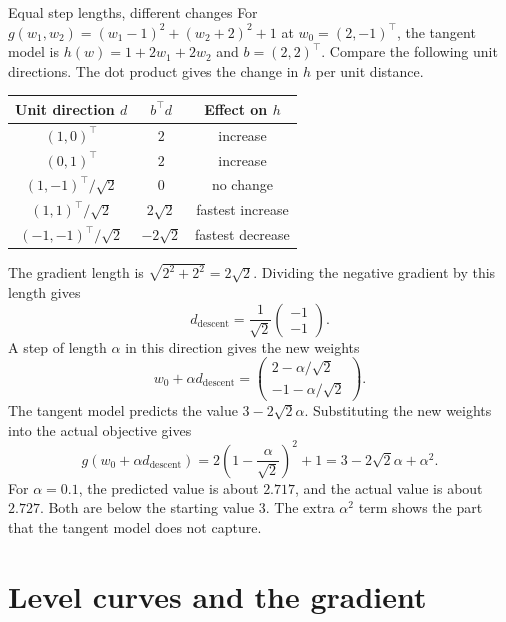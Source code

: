 \documentclass[a4paper,12pt,oneside]{report}
\begin{document}
\begin{framedexample}{Equal step lengths, different changes}
For $g(w_1,w_2)=(w_1-1)^2+(w_2+2)^2+1$ at $w_0=(2,-1)^\top$,
the tangent model is $h(w)=1+2w_1+2w_2$ and $b=(2,2)^\top$.
Compare the following unit directions. The dot product gives the
change in $h$ per unit distance.

\begin{center}
\begin{tabular}{ccc}
\toprule
Unit direction $d$ & $b^\top d$ & Effect on $h$\\
\midrule
$(1,0)^\top$ & $2$ & increase\\[3pt]
$(0,1)^\top$ & $2$ & increase\\[3pt]
$(1,-1)^\top/\sqrt{2}$ & $0$ & no change\\[3pt]
$(1,1)^\top/\sqrt{2}$ & $2\sqrt{2}$ & fastest increase\\[3pt]
$(-1,-1)^\top/\sqrt{2}$ & $-2\sqrt{2}$ & fastest decrease\\
\bottomrule
\end{tabular}
\end{center}

The gradient length is $\sqrt{2^2+2^2}=2\sqrt{2}$. Dividing the
negative gradient by this length gives
\[
  d_{\mathrm{descent}}=
  \frac{1}{\sqrt{2}}\begin{pmatrix}-1\\-1\end{pmatrix}.
\]
A step of length $\alpha$ in this direction gives the new weights
\[
  w_0+\alpha d_{\mathrm{descent}}
  =\begin{pmatrix}2-\alpha/\sqrt{2}\\-1-\alpha/\sqrt{2}\end{pmatrix}.
\]
The tangent model predicts the value $3-2\sqrt{2}\alpha$.
Substituting the new weights into the actual objective gives
\[
  g(w_0+\alpha d_{\mathrm{descent}})
  =2\left(1-\frac{\alpha}{\sqrt{2}}\right)^2+1
  =3-2\sqrt{2}\alpha+\alpha^2.
\]
For $\alpha=0.1$, the predicted value is about $2.717$, and the
actual value is about $2.727$. Both are below the starting value $3$.
The extra $\alpha^2$ term shows the part that the tangent model
does not capture.
\end{framedexample}

\clearpage
\section{Level curves and the gradient}
\end{document}
